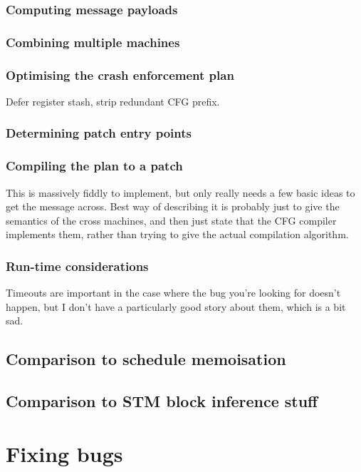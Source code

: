 \documentclass[12pt,a4paper]{book}
\begin{document}
\subsubsection{Computing message payloads}

\subsubsection{Combining multiple machines}

\subsubsection{Optimising the crash enforcement plan}
Defer register stash, strip redundant CFG prefix.

\subsubsection{Determining patch entry points}

\subsubsection{Compiling the plan to a patch}

This is massively fiddly to implement, but only really needs a few basic ideas to get the message across.
Best way of describing it is probably just to give the semantics of the cross machines, and then just state that the CFG compiler implements them, rather than trying to give the actual compilation algorithm.

\subsubsection{Run-time considerations}

Timeouts are important in the case where the bug you're looking for doesn't happen, but I don't have a particularly good story about them, which is a bit sad.

\subsection{Comparison to schedule memoisation}
\subsection{Comparison to STM block inference stuff}

\section{Fixing bugs}
\end{document}
